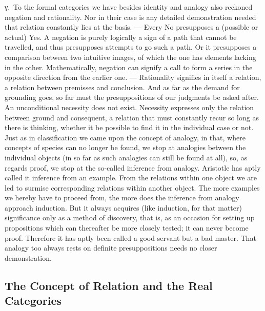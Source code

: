 \documentclass[12pt]{article}
\newcommand{\opage}[1]{\marginnote{\footnotesize\textit{[#1]}}}
\begin{document}
%
\label{sec:3b-gamma}%
γ.~To the formal categories we have besides identity and analogy also
reckoned negation and rationality. Nor in their case is any detailed
demonstration needed that relation constantly lies at the basis. --- Every
No presupposes a (possible or actual) Yes. A negation is purely logically a
sign of a path that cannot be travelled, and thus presupposes attempts to go
such a path. Or it presupposes a comparison between two intuitive images, of
which the one has elements lacking in the other. Mathematically, negation
can signify a call to form a series in the opposite direction from the
earlier one. --- Rationality signifies in itself a relation, a relation
between premisses and conclusion. And as far as the demand for grounding
goes, so far must the presuppositions of our judgments be asked after. An
unconditional necessity does not exist. Necessity expresses only the
relation between ground and consequent, a relation that must constantly
recur so long as there is thinking, whether it be possible to find it in the
individual case or not. Just as in classification we came upon the concept
of analogy, in that, where concepts of species can no longer be found, we
stop at analogies between the individual objects (in so far as such
analogies can still be found at all), so, as regards proof, we stop at the
so-called inference from analogy. Aristotle has aptly called it inference
from an example. From the relations within one object we are led to surmise
corresponding relations within another object. The more examples we hereby
have to proceed from, \opage{45}the more does the inference from analogy approach
induction. But it always acquires (like induction, for that matter)
significance only as a method of discovery, that is, as an occasion for
setting up propositions which can thereafter be more closely tested; it can
never become proof. Therefore it has aptly been called a good servant but a
bad master. That analogy too always rests on definite presuppositions needs
no closer demonstration.

\subsection{The Concept of Relation and the Real Categories}
\label{sec:3c}
\end{document}
